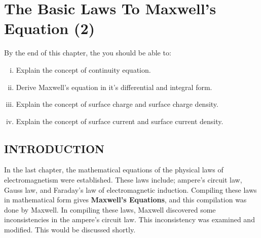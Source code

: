 \chapter{The Basic Laws To Maxwell's Equation (2)}\label{lec:lec19}

\begin{mdframed}[backgroundcolor=lightblue, linewidth=1pt, hidealllines=true]
	By the end of this chapter, the you should be able to:
	\begin{enumerate}[(i)]
			\item Explain the concept of continuity equation.
			
			\item Derive Maxwell's equation in it's differential and integral form.
			
			\item Explain the concept of surface charge and surface charge density. 
			
			\item Explain the concept of surface current and surface current density.
		\end{enumerate}
\end{mdframed}

\section{INTRODUCTION}
In the last chapter, the mathematical equations of the physical laws of electromagnetism were established. These laws include; ampere's circuit law, Gauss law, and Faraday's law of electromagnetic induction. Compiling these laws in mathematical form gives \textbf{Maxwell's Equations}, and this compilation was done by Maxwell. In compiling these laws, Maxwell discovered some inconsistencies in the ampere's circuit law. This inconsistency was examined and modified. This would be discussed shortly.

